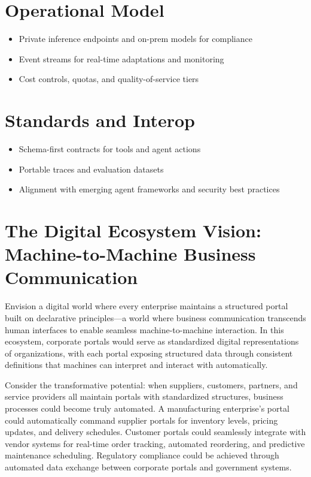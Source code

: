 \section{Operational Model}
\begin{itemize}
	\item Private inference endpoints and on-prem models for compliance
	\item Event streams for real-time adaptations and monitoring
	\item Cost controls, quotas, and quality-of-service tiers
\end{itemize}

\section{Standards and Interop}
\begin{itemize}
	\item Schema-first contracts for tools and agent actions
	\item Portable traces and evaluation datasets
	\item Alignment with emerging agent frameworks and security best practices
\end{itemize}

\section{The Digital Ecosystem Vision: Machine-to-Machine Business Communication}
\label{sec:digital-ecosystem-vision}

Envision a digital world where every enterprise maintains a structured portal built on declarative principles—a world where business communication transcends human interfaces to enable seamless machine-to-machine interaction. In this ecosystem, corporate portals would serve as standardized digital representations of organizations, with each portal exposing structured data through consistent \wbdl{} definitions that machines can interpret and interact with automatically.

Consider the transformative potential: when suppliers, customers, partners, and service providers all maintain portals with standardized structures, business processes could become truly automated. A manufacturing enterprise's portal could automatically command supplier portals for inventory levels, pricing updates, and delivery schedules. Customer portals could seamlessly integrate with vendor systems for real-time order tracking, automated reordering, and predictive maintenance scheduling. Regulatory compliance could be achieved through automated data exchange between corporate portals and government systems.

